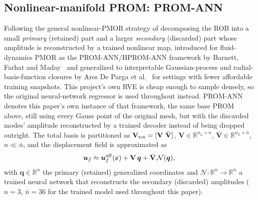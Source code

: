 \documentclass[10pt,a4paper]{article}
\begin{document}
\subsection{Nonlinear-manifold PROM: PROM-ANN}
\label{sec:background-decoder}
Following the general nonlinear-PMOR strategy of decomposing the ROB into a
small \emph{primary} (retained) part and a larger \emph{secondary}
(discarded) part whose amplitude is reconstructed by a trained nonlinear map,
introduced for fluid-dynamics PMOR as the PROM-ANN/HPROM-ANN framework
by Barnett, Farhat and Maday~\cite{Barnett2023} and generalized to
interpretable Gaussian-process and radial-basis-function closures by
Ares De Parga et al.~\cite{AresDeParga2026} for settings with fewer
affordable training snapshots. This project's own RVE is cheap enough
to sample densely, so the original neural-network regressor is used
throughout instead. PROM-ANN denotes this paper's own instance of that
framework, the same base PROM above, still using every
Gauss point of the original mesh, but with the discarded modes'
amplitude reconstructed by a trained decoder instead of being dropped
outright. The total basis is partitioned as
$\mathbf V_{\rm tot}=[\mathbf V\ \bar{\mathbf V}]$, $\mathbf V\in\mathbb
R^{n_L\times n}$, $\bar{\mathbf V}\in\mathbb R^{n_L\times\bar n}$,
$n\ll\bar n$, and the displacement field is approximated as
\begin{equation}
\label{eq:decoder}
 \bm u_f\approx \bm u_f^{\rm aff}(\bm\varepsilon)+\mathbf V\,\bm q+\bar{\mathbf V}\,\mathcal N(\bm q),
\end{equation}
with $\bm q\in\mathbb R^n$ the primary (retained) generalized coordinates
and $\mathcal N:\mathbb R^n\to\mathbb R^{\bar n}$ a trained neural network
that reconstructs the secondary (discarded) amplitudes ($n=3$, $\bar
n=36$ for the trained model used throughout this paper).
\end{document}
